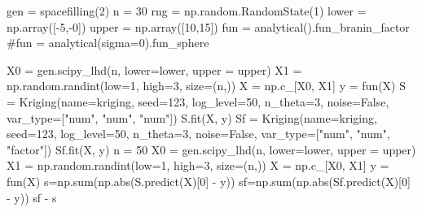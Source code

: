 \documentclass[
  letterpaper,
  DIV=11,
  numbers=noendperiod]{scrreprt}
\newenvironment{Shaded}{\begin{snugshade}}{\end{snugshade}}
\newcommand{\BuiltInTok}[1]{\textcolor[rgb]{0.00,0.23,0.31}{#1}}
\newcommand{\CommentTok}[1]{\textcolor[rgb]{0.37,0.37,0.37}{#1}}
\newcommand{\DecValTok}[1]{\textcolor[rgb]{0.68,0.00,0.00}{#1}}
\newcommand{\NormalTok}[1]{\textcolor[rgb]{0.00,0.23,0.31}{#1}}
\newcommand{\OperatorTok}[1]{\textcolor[rgb]{0.37,0.37,0.37}{#1}}
\newcommand{\StringTok}[1]{\textcolor[rgb]{0.13,0.47,0.30}{#1}}
\newcommand{\VariableTok}[1]{\textcolor[rgb]{0.07,0.07,0.07}{#1}}
\begin{document}
\begin{Shaded}
\begin{Highlighting}[]
\NormalTok{gen }\OperatorTok{=}\NormalTok{ spacefilling(}\DecValTok{2}\NormalTok{)}
\NormalTok{n }\OperatorTok{=} \DecValTok{30}
\NormalTok{rng }\OperatorTok{=}\NormalTok{ np.random.RandomState(}\DecValTok{1}\NormalTok{)}
\NormalTok{lower }\OperatorTok{=}\NormalTok{ np.array([}\OperatorTok{{-}}\DecValTok{5}\NormalTok{,}\OperatorTok{{-}}\DecValTok{0}\NormalTok{])}
\NormalTok{upper }\OperatorTok{=}\NormalTok{ np.array([}\DecValTok{10}\NormalTok{,}\DecValTok{15}\NormalTok{])}
\NormalTok{fun }\OperatorTok{=}\NormalTok{ analytical().fun\_branin\_factor}
\CommentTok{\#fun = analytical(sigma=0).fun\_sphere}

\NormalTok{X0 }\OperatorTok{=}\NormalTok{ gen.scipy\_lhd(n, lower}\OperatorTok{=}\NormalTok{lower, upper }\OperatorTok{=}\NormalTok{ upper)}
\NormalTok{X1 }\OperatorTok{=}\NormalTok{ np.random.randint(low}\OperatorTok{=}\DecValTok{1}\NormalTok{, high}\OperatorTok{=}\DecValTok{3}\NormalTok{, size}\OperatorTok{=}\NormalTok{(n,))}
\NormalTok{X }\OperatorTok{=}\NormalTok{ np.c\_[X0, X1]}
\NormalTok{y }\OperatorTok{=}\NormalTok{ fun(X)}
\NormalTok{S }\OperatorTok{=}\NormalTok{ Kriging(name}\OperatorTok{=}\StringTok{\textquotesingle{}kriging\textquotesingle{}}\NormalTok{,  seed}\OperatorTok{=}\DecValTok{123}\NormalTok{, log\_level}\OperatorTok{=}\DecValTok{50}\NormalTok{, n\_theta}\OperatorTok{=}\DecValTok{3}\NormalTok{, noise}\OperatorTok{=}\VariableTok{False}\NormalTok{, var\_type}\OperatorTok{=}\NormalTok{[}\StringTok{"num"}\NormalTok{, }\StringTok{"num"}\NormalTok{, }\StringTok{"num"}\NormalTok{])}
\NormalTok{S.fit(X, y)}
\NormalTok{Sf }\OperatorTok{=}\NormalTok{ Kriging(name}\OperatorTok{=}\StringTok{\textquotesingle{}kriging\textquotesingle{}}\NormalTok{,  seed}\OperatorTok{=}\DecValTok{123}\NormalTok{, log\_level}\OperatorTok{=}\DecValTok{50}\NormalTok{, n\_theta}\OperatorTok{=}\DecValTok{3}\NormalTok{, noise}\OperatorTok{=}\VariableTok{False}\NormalTok{, var\_type}\OperatorTok{=}\NormalTok{[}\StringTok{"num"}\NormalTok{, }\StringTok{"num"}\NormalTok{, }\StringTok{"factor"}\NormalTok{])}
\NormalTok{Sf.fit(X, y)}
\NormalTok{n }\OperatorTok{=} \DecValTok{50}
\NormalTok{X0 }\OperatorTok{=}\NormalTok{ gen.scipy\_lhd(n, lower}\OperatorTok{=}\NormalTok{lower, upper }\OperatorTok{=}\NormalTok{ upper)}
\NormalTok{X1 }\OperatorTok{=}\NormalTok{ np.random.randint(low}\OperatorTok{=}\DecValTok{1}\NormalTok{, high}\OperatorTok{=}\DecValTok{3}\NormalTok{, size}\OperatorTok{=}\NormalTok{(n,))}
\NormalTok{X }\OperatorTok{=}\NormalTok{ np.c\_[X0, X1]}
\NormalTok{y }\OperatorTok{=}\NormalTok{ fun(X)}
\NormalTok{s}\OperatorTok{=}\NormalTok{np.}\BuiltInTok{sum}\NormalTok{(np.}\BuiltInTok{abs}\NormalTok{(S.predict(X)[}\DecValTok{0}\NormalTok{] }\OperatorTok{{-}}\NormalTok{ y))}
\NormalTok{sf}\OperatorTok{=}\NormalTok{np.}\BuiltInTok{sum}\NormalTok{(np.}\BuiltInTok{abs}\NormalTok{(Sf.predict(X)[}\DecValTok{0}\NormalTok{] }\OperatorTok{{-}}\NormalTok{ y))}
\NormalTok{sf }\OperatorTok{{-}}\NormalTok{ s}
\end{Highlighting}
\end{Shaded}
\end{document}
